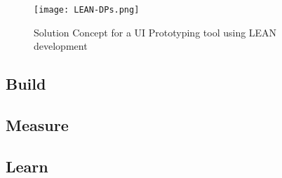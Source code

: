 \begin{figure}[htbp!]
  \centering    
  \texttt{[image: LEAN-DPs.png]}
  \caption[Solution Concept]{Solution Concept for a UI Prototyping tool using LEAN development}
  \label{fig:design:lean}
\end{figure}

\subsection{Build}
\label{design:section:build}

\subsection{Measure}
\label{design:section:measure}
\subsection{Learn}
\label{design:section:learn}